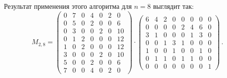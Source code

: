 Результат применения этого алгоритма для $n=8$ выглядит так:
\begin{equation*}
	M_{2, 8} = 
	\begin{pmatrix}
	0	& 7	& 0	& 4	& 0	& 2	& 0  \\
	0	& 5	& 0	& 2	& 0	& 0	& 6  \\
	0	& 3	& 0	& 0	& 2	& 0	& 10 \\
	0	& 1	& 2	& 0	& 0	& 0	& 12 \\
	1	& 0	& 2	& 0	& 0	& 0	& 12 \\
	3	& 0	& 0	& 0	& 2	& 0	& 10 \\
	5	& 0	& 0	& 2	& 0	& 0	& 6  \\
	7	& 0	& 0	& 4	& 0	& 2	& 0
	\end{pmatrix}               
	\cdot
	\begin{pmatrix}
	6	& 4	& 2	& 0	& 0	& 0	& 0	& 0 \\
	0	& 0	& 0	& 0	& 2	& 4	& 6	& 0 \\
	3	& 1	& 0	& 0	& 0	& 1	& 3	& 0 \\
	0	& 0	& 1	& 3	& 1	& 0	& 0	& 0 \\
	1	& 0	& 0	& 1	& 0	& 0	& 1	& 0 \\
	0	& 1	& 1	& 0	& 1	& 1	& 0	& 0 \\
	0	& 0	& 0	& 0	& 0	& 0 & 0	& 1
	\end{pmatrix}    \,.
\end{equation*}         

\DontPrintSemicolon %

